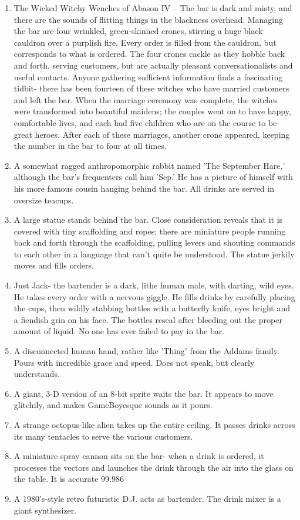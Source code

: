 \documentclass{article}
\begin{document}
\begin{enumerate}
	\item The Wicked Witchy Wenches of Abason IV – The bar is dark and misty, and there are the sounds of flitting things in the blackness overhead. Managing the bar are four wrinkled, green-skinned crones, stirring a huge black cauldron over a purplish fire. Every order is filled from the cauldron, but corresponds to what is ordered. The four crones cackle as they hobble back and forth, serving customers, but are actually pleasant conversationalists and useful contacts. Anyone gathering sufficient information finds a fascinating tidbit- there has been fourteen of these witches who have married customers and left the bar. When the marriage ceremony was complete, the witches were transformed into beautiful maidens; the couples went on to have happy, comfortable lives, and each had five children who are on the course to be great heroes. After each of these marriages, another crone appeared, keeping the number in the bar to four at all times.
	\item A somewhat ragged anthropomorphic rabbit named 'The September Hare,' although the bar's frequenters call him 'Sep.' He has a picture of himself with his more famous cousin hanging behind the bar. All drinks are served in oversize teacups.
	\item A large statue stands behind the bar. Close consideration reveals that it is covered with tiny scaffolding and ropes; there are miniature people running back and forth through the scaffolding, pulling levers and shouting commands to each other in a language that can't quite be understood. The statue jerkily moves and fills orders.
	\item Just Jack- the bartender is a dark, lithe human male, with darting, wild eyes. He takes every order with a nervous giggle. He fills drinks by carefully placing the cups, then wildly stabbing bottles with a butterfly knife, eyes bright and a fiendish grin on his face. The bottles reseal after bleeding out the proper amount of liquid. No one has ever failed to pay in the bar.
	\item A disconnected human hand, rather like 'Thing' from the Addams family. Pours with incredible grace and speed. Does not speak, but clearly understands.
	\item A giant, 3-D version of an 8-bit sprite waits the bar. It appears to move glitchily, and makes GameBoyesque sounds as it pours.
	\item A strange octopus-like alien takes up the entire ceiling. It passes drinks across its many tentacles to serve the various customers.
	\item A miniature spray cannon sits on the bar- when a drink is ordered, it processes the vectors and launches the drink through the air into the glass on the table. It is accurate 99.986%
	\item A 1980's-style retro futuristic D.J. acts as bartender. The drink mixer is a giant synthesizer.

\end{enumerate}
\end{document}
